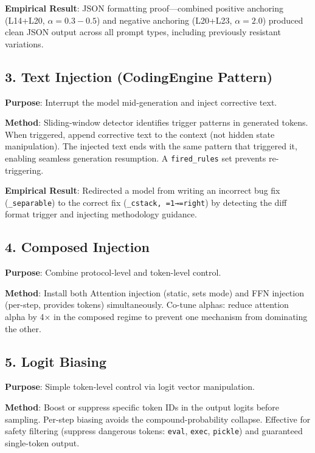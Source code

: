 \documentclass[11pt,a4paper]{article}
\begin{document}
\textbf{Empirical Result}: JSON formatting proof---combined positive anchoring (L14+L20, $\alpha=0.3-0.5$) and negative anchoring (L20+L23, $\alpha=2.0$) produced clean JSON output across all prompt types, including previously resistant variations.

\subsection{3. Text Injection (CodingEngine Pattern)}

\textbf{Purpose}: Interrupt the model mid-generation and inject corrective text.

\textbf{Method}: Sliding-window detector identifies trigger patterns in generated tokens. When triggered, append corrective text to the context (not hidden state manipulation). The injected text ends with the same pattern that triggered it, enabling seamless generation resumption. A \texttt{fired\_rules} set prevents re-triggering.

\textbf{Empirical Result}: Redirected a model from writing an incorrect bug fix (\texttt{\_separable}) to the correct fix (\texttt{\_cstack, =1→=right}) by detecting the diff format trigger and injecting methodology guidance.

\subsection{4. Composed Injection}

\textbf{Purpose}: Combine protocol-level and token-level control.

\textbf{Method}: Install both Attention injection (static, sets mode) and FFN injection (per-step, provides tokens) simultaneously. Co-tune alphas: reduce attention alpha by 4× in the composed regime to prevent one mechanism from dominating the other.

\subsection{5. Logit Biasing}

\textbf{Purpose}: Simple token-level control via logit vector manipulation.

\textbf{Method}: Boost or suppress specific token IDs in the output logits before sampling. Per-step biasing avoids the compound-probability collapse. Effective for safety filtering (suppress dangerous tokens: \texttt{eval}, \texttt{exec}, \texttt{pickle}) and guaranteed single-token output.
\end{document}
